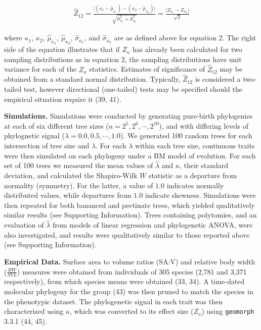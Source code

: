 \documentclass[
]{article}
\begin{document}
\begin{align}
  \hat{Z}_{12}=\frac{\lvert{(\kappa_{1}-\hat\mu_{\kappa_1})-(\kappa_{2}-\hat\mu_{\kappa_2})}\rvert}{\sqrt{\hat\sigma^2_{\kappa_1}+\hat\sigma^2_{\kappa_2}}} = \frac{\lvert Z_{\kappa_1} - Z_{\kappa_2}\rvert}{\sqrt{2}}
\end{align}

where \(\kappa_1\), \(\kappa_2\), \(\hat\mu_{\kappa_1}\),
\(\hat\mu_{\kappa_2}\), \(\hat\sigma_{\kappa_1}\), and
\(\hat\sigma_{\kappa_2}\) are as defined above for equation 2. The right
side of the equation illustrates that if \(Z_\kappa\) has already been
calculated for two sampling distributions as in equation 2, the sampling
distributions have unit variance for each of the \(Z_\kappa\)
statistics. Estimates of significance of \(\hat{Z}_{12}\) may be
obtained from a standard normal distribution. Typically,
\(\hat{Z}_{12}\) is considered a two-tailed test, however directional
(one-tailed) tests may be specified should the empirical situation
require it (39, 41). \hfill\break

\textbf{Simulations.} Simulations were conducted by generating
pure-birth phylogenies at each of six different tree sizes
(\(n=2^5, 2^6, \cdots, 2^{10}\)), and with differing levels of
phylognetic signal (\(\lambda=0.0, 0.5, \cdots, 1.0\)). We generated 100
random trees for each intersection of tree size and \(\lambda\). For
each \(\lambda\) within each tree size, continuous traits were then
simulated on each phylogeny under a BM model of evolution. For each set
of 100 trees we measured the mean values of \(\hat{\lambda}\) and
\(\kappa\), their standard deviation, and calculated the Shapiro-Wilk
\(W\) statistic as a departure from normality (symmetry). For the
latter, a value of \(1.0\) indicates normally distributed values, while
departures from \(1.0\) indicate skewness. Simulations were then
repeated for both bananced and pectinate trees, which yielded
qualitatively similar results (see Supporting Information). Trees
containing polytomies, and an evaluation of \(\hat{\lambda}\) from
models of linear regression and phylogenetic ANOVA, were also
investigated, and results were qualitatively similar to those reported
above (see Supporting Information). \hfill\break

\textbf{Empirical Data.} Surface area to volume ratios (SA:V) and
relative body width (\(\frac{BW}{SVL}\)) measures were obtained from
individuals of 305 species (2,781 and 3,371 respectively), from which
species means were obtained (33, 34). A time-dated molecular phylogeny
for the group (43) was then pruned to match the species in the
phenotypic dataset. The phylogenetic signal in each trait was then
characterized using \(\kappa\), which was converted to its effect size
(\(Z_\kappa\)) using \texttt{geomorph} 3.3.1 (44, 45).
\end{document}
